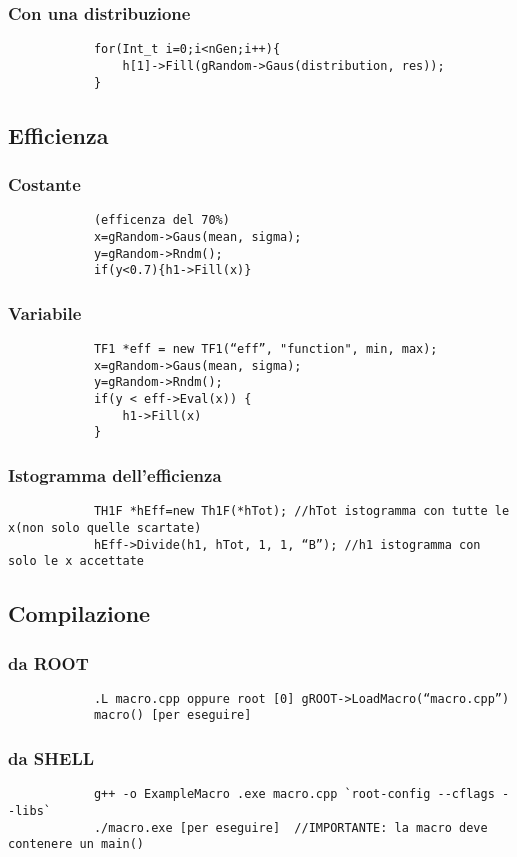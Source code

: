 \documentclass[a4paper]{article}
\begin{document}
        \subsubsection{Con una distribuzione}
        \begin{verbatim}
            for(Int_t i=0;i<nGen;i++){
                h[1]->Fill(gRandom->Gaus(distribution, res));
            }
        \end{verbatim}
    \subsection{Efficienza}
        \subsubsection{Costante}
        \begin{verbatim}
            (efficenza del 70%)
            x=gRandom->Gaus(mean, sigma);
            y=gRandom->Rndm();
            if(y<0.7){h1->Fill(x)}
        \end{verbatim}
        \subsubsection{Variabile}
        \begin{verbatim}
            TF1 *eff = new TF1(“eff”, "function", min, max);
            x=gRandom->Gaus(mean, sigma);
            y=gRandom->Rndm();
            if(y < eff->Eval(x)) {
                h1->Fill(x)
            }
        \end{verbatim}
        \subsubsection{Istogramma dell'efficienza}
        \begin{verbatim}
            TH1F *hEff=new Th1F(*hTot); //hTot istogramma con tutte le x(non solo quelle scartate)
            hEff->Divide(h1, hTot, 1, 1, “B”); //h1 istogramma con solo le x accettate
        \end{verbatim}
    \subsection{Compilazione}
        \subsubsection{da ROOT}
        \begin{verbatim}
            .L macro.cpp oppure root [0] gROOT->LoadMacro(“macro.cpp”)
            macro() [per eseguire]
        \end{verbatim}
        \subsubsection{da SHELL}
        \begin{verbatim}
            g++ -o ExampleMacro .exe macro.cpp `root-config --cflags --libs`
            ./macro.exe [per eseguire]  //IMPORTANTE: la macro deve contenere un main()
        \end{verbatim}
\end{document}
